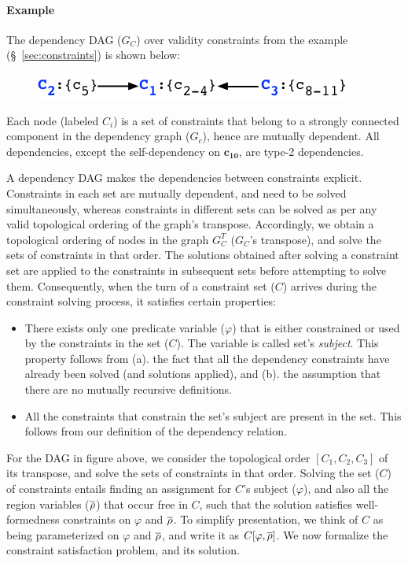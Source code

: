 \paragraph{Example} The dependency DAG ($G_C$) over validity
constraints from the  example (\S~\ref{sec:constraints}) is
shown below: %
\vspace*{-0.08in}
\begin{figure}[H]
\includegraphics[scale=0.6]{DepDAG.png}
\end{figure}
\vspace*{-0.08in}
Each node (labeled $C_i$) is a set of constraints that belong to a
strongly connected component in the dependency graph ($G_c$), hence
are mutually dependent. All dependencies, except the self-dependency
on $\mathbf{c_{10}}$, are type-2 dependencies.

A dependency DAG makes the dependencies between constraints explicit.
Constraints in each set are mutually dependent, and need to be solved
simultaneously, whereas constraints in different sets can be solved as
per any valid topological ordering of the graph's transpose.
Accordingly, we obtain a topological ordering of nodes in the graph
$G_{{C}}^{T}$ ($G_C$'s transpose), and solve the sets of constraints
in that order. The solutions obtained after solving a constraint set
are applied to the constraints in subsequent sets before attempting to
solve them.  Consequently, when the turn of a constraint set ($C$)
arrives during the constraint solving process, it satisfies certain
properties:
\begin{itemize}
\item There exists only one predicate variable ($\varphi$) that is either
constrained or used by the constraints in the set ($C$). The variable is
called set's \emph{subject}. This property follows from (a). the fact
that all the dependency constraints have already been solved (and
solutions applied), and (b). the assumption that there are no mutually
recursive definitions. 
\item All the constraints that constrain the set's subject are present
in the set. This follows from our definition of the dependency relation.
\end{itemize}

For the DAG in figure above, we consider the topological order $[C_1,
C_2, C_3]$ of its transpose, and solve the sets of constraints in that
order.  Solving the set ($C$) of constraints entails finding an
assignment for $C$'s subject ($\varphi$), and also all the region
variables ($\overline{\rho}$) that occur free in $C$, such that the solution
satisfies well-formedness constraints on $\varphi$ and $\overline{\rho}$. To
simplify presentation, we think of $C$ as being parameterized on
$\varphi$ and $\overline{\rho}$, and write it as $C\lbrack \varphi,\overline{\rho}
\rbrack$. We now formalize the constraint satisfaction problem, and
its solution.

